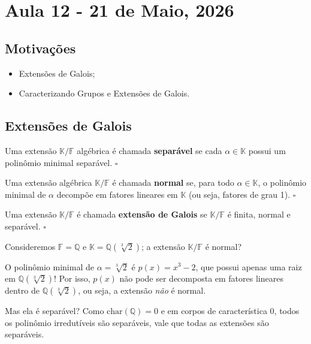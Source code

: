 \documentclass[../algebraIII_notes.tex]{subfiles}
\begin{document}
\section{Aula 12 - 21 de Maio, 2026}
\subsection{Motivações}
\begin{itemize}
	\item Extensões de Galois;
	\item Caracterizando Grupos e Extensões de Galois.
\end{itemize}
\subsection{Extensões de Galois}
\begin{def*}
	Uma extensão \(\mathbb{K}/\mathbb{F}\) algébrica é chamada \textbf{separável} se cada \(\alpha \in \mathbb{K}\) possui um polinômio minimal separável. \(\square\)
\end{def*}
\begin{def*}
	Uma extensão algébrica \(\mathbb{K}/\mathbb{F}\) é chamada \textbf{normal} se, para todo \(\alpha \in \mathbb{K}\), o polinômio minimal de \(\alpha \) decompõe em fatores lineares em \(\mathbb{K}\) (ou seja, fatores de grau 1). \(\square\)
\end{def*}
\begin{def*}
	Uma extensão \(\mathbb{K}/\mathbb{F}\) é chamada \textbf{extensão de Galois} se \(\mathbb{K}/\mathbb{F}\) é finita, normal e separável. \(\square\)
\end{def*}
\begin{example}
	Consideremos \(\mathbb{F} = \mathbb{Q}\) e \(\mathbb{K} = \mathbb{Q}(\sqrt[3]{2})\); a extensão \(\mathbb{K}/\mathbb{F}\) é normal?

	O polinômio minimal de \(\alpha = \sqrt[3]{2}\) é \(p(x) = x^{3}-2\), que possui apenas uma raiz em \(\mathbb{Q}(\sqrt[3]{2})\)! Por isso, \(p(x)\) não pode ser decomposta em fatores lineares dentro de \(\mathbb{Q}(\sqrt[3]{2})\), ou seja, a extensão \textit{não} é normal.

	Mas ela é separável? Como \(\mathrm{char}(\mathbb{Q}) = 0\) e em corpos de característica 0, todos os polinômio irredutíveis são separáveis, vale que todas as extensões são separáveis.
\end{example}
\end{document}
